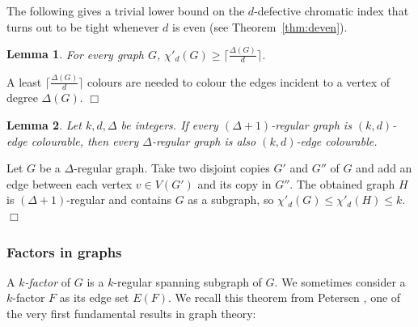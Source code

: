 \documentclass[11pt]{article}
\newtheorem{lemma}{Lemma}[section]
\newcounter{claim}
\newenvironment{proof}[1][]%
 {\noindent {\setcounter{claim}{0}\sc proof ---
   }{#1}{}}{\hfill$\Box$\vspace{2ex}}
\begin{document}
The following gives a trivial lower bound on the $d$-defective chromatic index that turns out to be tight whenever $d$ is even (see Theorem~\ref{thm:deven}). 

\begin{lemma}\label{lem:trivialbound}
For every graph $G$, $\chi'_{d}(G) \geq \lceil \frac{\Delta(G)}{d} \rceil$.
\end{lemma}

\begin{proof}
A least $\lceil \frac{\Delta(G)}{d} \rceil$ colours are needed to colour the edges incident to a vertex of degree $\Delta(G)$.
\end{proof}



\begin{lemma}\label{lem:chi_increasing}
Let $k, d, \Delta$ be integers. 
If every $(\Delta + 1)$-regular graph is $(k,d)$-edge colourable, then every $\Delta$-regular graph is also  $(k,d)$-edge colourable. 
\end{lemma}

\begin{proof}
Let $G$ be a $\Delta$-regular graph. 
Take two disjoint copies $G'$ and $G''$ of $G$ and add an edge between each vertex $v \in V(G')$ and its copy in $G''$. The obtained graph $H$ is $(\Delta+1)$-regular and contains $G$ as a subgraph, so $\chi'_d(G) \leq \chi'_d(H) \leq k$. 
\end{proof}




\subsubsection*{Factors in graphs}

A \emph{$k$-factor} of $G$ is a $k$-regular spanning subgraph of $G$. 
We sometimes consider a $k$-factor $F$ as its edge set $E(F)$. 
We recall this theorem from Petersen \cite{P91}, one of the very first fundamental results in graph theory:
\end{document}
